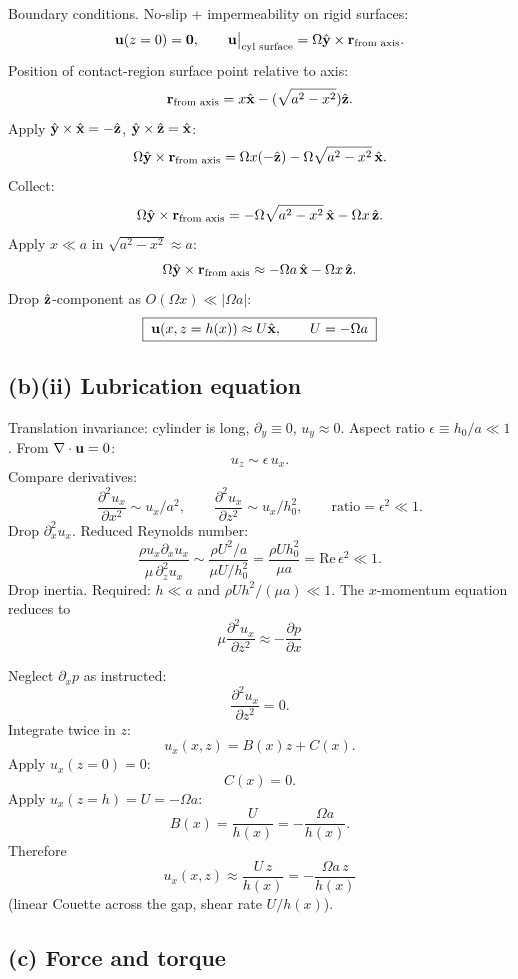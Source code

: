 \documentclass[11pt]{article}
\newcommand{\pd}[2]{\frac{\partial #1}{\partial #2}}
\newcommand{\pdd}[2]{\frac{\partial^{2} #1}{\partial #2^{2}}}
\begin{document}
Boundary conditions. No-slip + impermeability on rigid surfaces:
\[
\vb u(z=0)=\vb 0,\qquad \vb u\big|_{\text{cyl surface}}=\Omega\hat{\vb y}\times\vb r_{\text{from axis}}.
\]
Position of contact-region surface point relative to axis:
\[
\vb r_{\text{from axis}}=x\hat{\vb x}-(\sqrt{a^2-x^2})\hat{\vb z}.
\]
Apply $\hat{\vb y}\times\hat{\vb x}=-\hat{\vb z}$, $\hat{\vb y}\times\hat{\vb z}=\hat{\vb x}$:
\[
\Omega\hat{\vb y}\times\vb r_{\text{from axis}}=\Omega x(-\hat{\vb z})-\Omega\sqrt{a^2-x^2}\,\hat{\vb x}.
\]
Collect:
\[
\Omega\hat{\vb y}\times\vb r_{\text{from axis}}=-\Omega\sqrt{a^2-x^2}\,\hat{\vb x}-\Omega x\,\hat{\vb z}.
\]
Apply $x\ll a$ in $\sqrt{a^2-x^2}\approx a$:
\[
\Omega\hat{\vb y}\times\vb r_{\text{from axis}}\approx -\Omega a\,\hat{\vb x}-\Omega x\,\hat{\vb z}.
\]
Drop $\hat{\vb z}$-component as $O(\Omega x)\ll |\Omega a|$:
\[
\boxed{\;\vb u(x,z=h(x))\approx U\hat{\vb x},\qquad U=-\Omega a\;}
\]

\subsection*{(b)(ii) Lubrication equation}

Translation invariance: cylinder is long, $\partial_y\equiv 0$, $u_y\approx 0$. Aspect ratio $\epsilon\equiv h_0/a\ll 1$. From $\nabla\cdot\vb u=0$:
\[
u_z\sim \epsilon\,u_x.
\]
Compare derivatives:
\[
\pdd{u_x}{x}\sim u_x/a^2,\qquad \pdd{u_x}{z}\sim u_x/h_0^2,\qquad\text{ratio}=\epsilon^2\ll 1.
\]
Drop $\partial_x^2 u_x$. Reduced Reynolds number:
\[
\frac{\rho u_x \partial_x u_x}{\mu\,\partial_z^2 u_x}\sim \frac{\rho U^2/a}{\mu U/h_0^2}=\frac{\rho U h_0^2}{\mu a}=\mathrm{Re}\,\epsilon^2\ll 1.
\]
Drop inertia. Required: $h\ll a$ and $\rho U h^2/(\mu a)\ll 1$. The $x$-momentum equation reduces to
\begin{equation}
\boxed{\;\mu\pdd{u_x}{z}\approx -\pd{p}{x}\;}
\label{eq:lub}
\end{equation}

Neglect $\partial_x p$ as instructed:
\[
\pdd{u_x}{z}=0.
\]
Integrate twice in $z$:
\[
u_x(x,z)=B(x)z+C(x).
\]
Apply $u_x(z=0)=0$:
\[
C(x)=0.
\]
Apply $u_x(z=h)=U=-\Omega a$:
\[
B(x)=\frac{U}{h(x)}=-\frac{\Omega a}{h(x)}.
\]
Therefore
\begin{equation}
\boxed{\;u_x(x,z)\approx \frac{U\,z}{h(x)}=-\frac{\Omega a\,z}{h(x)}\;}
\label{eq:lub-ux}
\end{equation}
(linear Couette across the gap, shear rate $U/h(x)$).

\subsection*{(c) Force and torque}
\end{document}
